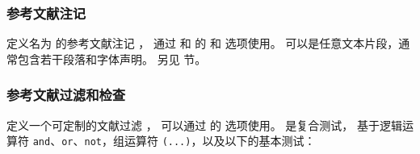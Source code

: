 \subsubsection{参考文献注记}%
\label{use:bib:nts}

\begin{ltxsyntax}



定义名为  的参考文献注记 ，
通过  和  的  和  选项使用。
 可以是任意文本片段，通常包含若干段落和字体声明。
另见  节。

\end{ltxsyntax}

\subsubsection{参考文献过滤和检查} %
\label{use:bib:flt}

\begin{ltxsyntax}



定义一个可定制的文献过滤 ，
可以通过  的  选项使用。
 是复合测试，
基于逻辑运算符 \texttt{and}、\texttt{or}、\texttt{not}，组运算符 \texttt{(...)}，以及以下的基本测试：

\end{ltxsyntax}

